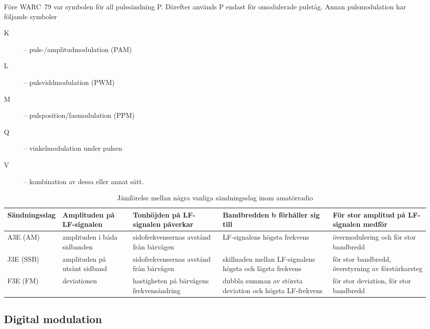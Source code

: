 Före WARC~79 var symbolen för all pulssändning P.
Därefter används P endast för omodulerade pulståg.
Annan pulsmodulation har följande symboler

\begin{description}
\item[K] -- puls-/amplitudmodulation (PAM)
\item[L] -- pulsviddmodulation (PWM)
\item[M] -- pulsposition/fasmodulation (PPM)
\item[Q] -- vinkelmodulation under pulsen
\item[V] -- kombination av dessa eller annat sätt.
\end{description}

\begin{table*}[ht]
\begin{center}
\begin{tabular}{|L{.12\textwidth}|L{.18\textwidth}|L{.18\textwidth}|L{.18\textwidth}|L{.19\textwidth}|}
\hline
  Sändningsslag &
    Amplituden på LF-signalen &
    Tonhöjden på LF- signalen påverkar & 
    Bandbredden b förhåller sig till &
    För stor amplitud på LF-signalen medför \\
  \hline %
  A3E (AM) & 
    amplituden i båda sidbanden &
    sidofrekvensernas avstånd från bärvågen &
    LF-signalens högsta frekvens & 
    övermodulering och för stor bandbredd \\
  J3E (SSB) & 
    amplituden på utsänt sidband & 
    sidofrekvensernas avstånd från bärvågen  & 
    skillnaden mellan LF-signalens högsta och lägsta frekvens & 
    för stor bandbredd, överstyrning av förstärkarsteg \\
  F3E (FM) &
    deviationen & 
    hastigheten på bärvågens frekvensändring &
    dubbla summan av största deviation och högsta LF-frekvens & 
    för stor deviation, för stor bandbredd \\
  \hline %
\end{tabular}
\end{center}
\caption{Jämförelse mellan några vanliga sändningsslag inom amatörradio}
\end{table*}


\subsection{Digital modulation}
\label{modulation_digital}

